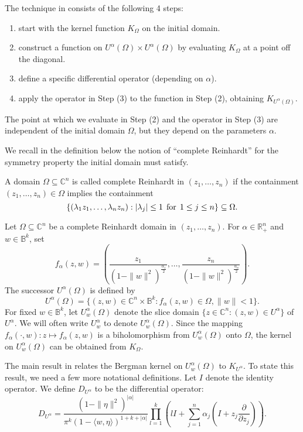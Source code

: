 \documentclass[reqno,12pt]{amsart}
\numberwithin{equation}{section}
\begin{document}
The technique in \cite{Zhenghui} consists of the following 4 steps:
\begin{enumerate}
	\item start with the kernel function $K_{\Omega}$ on the initial domain.
	\item construct a function on $U^{\alpha}(\Omega)\times U^{\alpha}(\Omega)$ by evaluating $K_{\Omega}$ at a point off the diagonal.
	\item define a specific differential operator (depending on $\alpha$).
	\item apply the operator in Step (3) to the function in Step (2), obtaining $K_{U^{\alpha}(\Omega)}$.
\end{enumerate}
The point at which we evaluate in Step (2) and the operator in Step (3) are independent of the initial domain $\Omega$, {but they depend on the parameters $\alpha$}. 

We {recall} in the definition below the notion of ``{complete Reinhardt}'' for the symmetry property the initial domain must satisfy.
\begin{de}
	A domain {$\Omega\subseteq\mathbb C^{n}$} is called {complete Reinhardt} in $(z_1,\dots,z_n)$ if the containment $(z_1,\dots,z_n)\in \Omega$ implies the containment
	$$\{(\lambda_1z_1,\dots,\lambda_n z_n):
	|\lambda_j|\leq 1 \:\:{\rm{{for}}}\:\: 1\leq j\leq n\}\subseteq\Omega.$$ 
\end{de}
Let $\Omega\subseteq \mathbb C^{n}$ be a {complete Reinhardt} domain in $(z_1,\dots,z_n)$. For {$\alpha\in \mathbb R^{n}_+$ and $w\in \mathbb B^k$}, set 
\begin{equation}\label{f}
f_{\alpha}\left(z,w\right)=\left(\frac{z_1}{(1-\|w\|^2)^{\frac{\alpha_1}{2}}},\dots,\frac{z_n}{(1-\|w\|^2)^{\frac{\alpha_n}{2}}}\right).
\end{equation}
The successor $U^\alpha(\Omega)$ is defined by 
{\begin{equation}\label{U}
	U^{\alpha}(\Omega)=\{(z,w)\in \mathbb C^{n}\times \mathbb B^k:f_{\alpha}(z,w)\in \Omega,\|w\|<1\}.
	\end{equation}}
For fixed $w\in \mathbb B^k$, let $U^{\alpha}_w(\Omega)$ denote the slice domain $\{z\in \mathbb C^{n}:(z,w)\in U^{\alpha}\}$ of $U^{\alpha}$. {We will often write $U^{\alpha}_{w}$ to denote $U^{\alpha}_w(\Omega)$. Since the mapping $f_{\alpha}(\cdot,w):z\mapsto f_\alpha(z,w)$ is a biholomorphism from $U^{\alpha}_w(\Omega)$ onto $\Omega$, the kernel on $U^{\alpha}_w(\Omega)$ can be obtained from $K_{\Omega}$.}

The main result in \cite{Zhenghui} relates the Bergman kernel on $U^{\alpha}_w(\Omega)$ to $K_{U^{\alpha}}$. {To state this result, we need a few more {notational definitions}.}
Let $I$ denote the identity operator. We define $D_{U^{\alpha}}$ to be the differential operator:
\begin{equation}\label{D}
D_{U^{\alpha}}=\frac{(1-\|\eta\|^2)^{|\alpha|}}{\pi^k(1- \langle w,\eta\rangle)^{1+k+|\alpha|}}\prod_{l=1}^{k}\left(lI+\sum_{j=1}^{n}\alpha_j\left(I+z_j\frac{\partial}{\partial z_j}\right)\right).
\end{equation}
\end{document}
